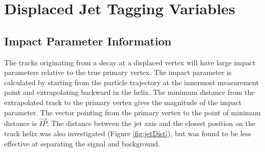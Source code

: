 

\section{Displaced Jet Tagging Variables}


\subsection{Impact Parameter Information}


The tracks originating from a decay at a displaced vertex will have large impact parameters relative
to the true primary vertex. The impact parameter is calculated by starting from the particle trajectory at the
innermost measurement point  and extrapolating backward in the helix. The minimum distance from the extrapolated
track to the primary vertex gives the magnitude of the impact parameter. The vector pointing from the primary vertex to the point of 
minimum distance is $\vec{IP}$. The distance between the jet axis and the closest position on the track helix was also investigated
 (Figure \ref{fig:jetDist}), but was found to be less effective at separating the signal and background. 

